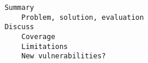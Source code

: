 \begin{verbatim}
    Summary
        Problem, solution, evaluation
    Discuss 
        Coverage
        Limitations
        New vulnerabilities? 
\end{verbatim}
